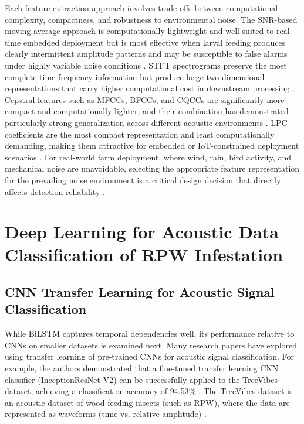 \documentclass[12pt,a4paper,oneside]{memoir}
\begin{document}
Each feature extraction approach involves trade-offs between computational complexity, compactness, and robustness to environmental noise. The SNR-based moving average approach is computationally lightweight and well-suited to real-time embedded deployment but is most effective when larval feeding produces clearly intermittent amplitude patterns and may be susceptible to false alarms under highly variable noise conditions \cite{wang2021}. STFT spectrograms preserve the most complete time-frequency information but produce large two-dimensional representations that carry higher computational cost in downstream processing \cite{boulila2023}. Cepstral features such as MFCCs, BFCCs, and CQCCs are significantly more compact and computationally lighter, and their combination has demonstrated particularly strong generalization across different acoustic environments \cite{boulila2023}. LPC coefficients are the most compact representation and least computationally demanding, making them attractive for embedded or IoT-constrained deployment scenarios \cite{saranya2025}. For real-world farm deployment, where wind, rain, bird activity, and mechanical noise are unavoidable, selecting the appropriate feature representation for the prevailing noise environment is a critical design decision that directly affects detection reliability \cite{pinhas2008,rach2013,saranya2025}.

\section{Deep Learning for Acoustic Data Classification of RPW Infestation}

\subsection{CNN Transfer Learning for Acoustic Signal Classification}

While BiLSTM captures temporal dependencies well, its performance relative to CNNs on smaller datasets is examined next. Many research papers have explored using transfer learning of pre-trained CNNs for acoustic signal classification. For example, the authors demonstrated that a fine-tuned transfer learning CNN classifier (InceptionResNet-V2) can be successfully applied to the TreeVibes dataset, achieving a classification accuracy of 94.53\% \cite{karar2021}. The TreeVibes dataset is an acoustic dataset of wood-feeding insects (such as RPW), where the data are represented as waveforms (time vs. relative amplitude) \cite{rigakis2021}.
\end{document}
